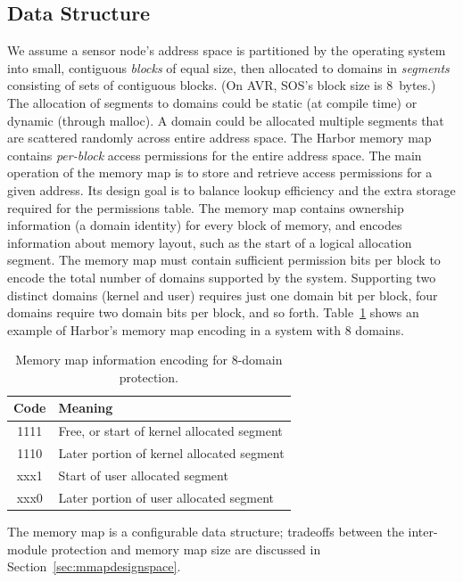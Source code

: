 \subsection{Data Structure}
%
We assume a sensor node's address space is partitioned by the operating
system into small, contiguous \emph{blocks} of equal size, then allocated
to domains in \textit{segments} consisting of sets of contiguous blocks.
%
(On AVR, SOS's block size is 8~bytes.)
%
The allocation of segments to domains could be static (at compile
time) or dynamic (through malloc).
%
A domain could be allocated multiple segments that are scattered
randomly across entire address space.
%
The Harbor memory map contains \emph{per-block} access permissions for
the entire address space.
%
The main operation of the memory map is to store and retrieve access
permissions for a given address.
%
Its design goal is to balance lookup efficiency and the extra storage
required for the permissions table.
%
The memory map contains ownership information (a domain identity) for every
block of memory, and encodes information about memory layout, such as
the start of a logical allocation segment.
%
The memory map must contain sufficient permission bits per block to encode
the total number of domains supported by the system.
%
Supporting two distinct domains (kernel and user) requires just one
domain bit per block, four domains require two domain bits per block,
and so forth.
%
Table~\ref{tab:mmap_table} shows an example of Harbor's memory map encoding
in a system with 8 domains.
%
\begin{table}[htdp]
\centering
\small{
\begin{tabular}{|c|l|}
	\hline
	Code & Meaning\\
	\hline
	1111 & Free, or start of kernel allocated segment\\
	1110 & Later portion of kernel allocated segment\\
	xxx1 & Start of user allocated segment\\
	xxx0 & Later portion of user allocated segment\\
	\hline
\end{tabular}}
\caption{Memory map information encoding for 8-domain protection.}
\label{tab:mmap_table}
\end{table}

%
The memory map is a configurable data structure; tradeoffs between
the inter-module protection and memory map size are discussed in
Section~\ref{sec:mmapdesignspace}.
%
%
%
%
%
%
%
